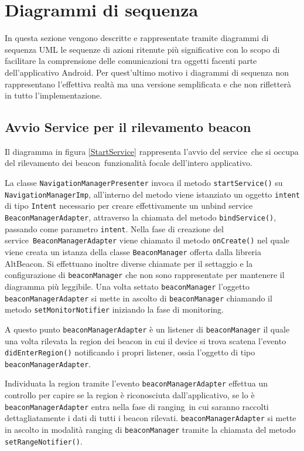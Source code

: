 \documentclass[../DefinizioneDiProdotto.tex]{subfiles}
\begin{document}
\section{Diagrammi di sequenza}

	In questa sezione vengono descritte e rappresentate tramite diagrammi di sequenza UML le sequenze di azioni ritenute più significative con lo scopo di facilitare la comprensione delle comunicazioni tra oggetti facenti parte dell'applicativo Android\g. Per quest'ultimo motivo i diagrammi di sequenza non rappresentano l'effettiva realtà ma una versione semplificata e che non rifletterà in tutto l'implementazione.
	
	\subsection{Avvio Service per il rilevamento beacon}
	
	
		Il diagramma in figura \ref{StartService} rappresenta l'avvio del service\g\ che si occupa del rilevamento dei beacon\g\, funzionalità focale dell'intero applicativo.
		
	La classe \verb|NavigationManagerPresenter| invoca il metodo \verb|startService()| su \verb|NavigationManagerImp|, all'interno del metodo viene istanziato un oggetto \verb|intent| di tipo \verb|Intent| necessario per creare effettivamente un unbind service\g\, \verb|BeaconManagerAdapter|, attraverso la chiamata del metodo \verb|bindService()|,  passando come parametro \verb|intent|. 
	Nella fase di creazione del service\g\ \verb|BeaconManagerAdapter| viene chiamato il metodo \verb|onCreate()| nel quale viene creata un istanza della classe \verb|BeaconManager| offerta dalla libreria AltBeacon\g. Si effettuano inoltre diverse chiamate per il settaggio e la configurazione di \verb|beaconManager| che non sono rappresentate per mantenere il diagramma più leggibile. Una volta settato \verb|beaconManager| l'oggetto \verb|beaconManagerAdapter| si mette in ascolto di \verb|beaconManager| chiamando il metodo \verb|setMonitorNotifier| iniziando la fase di monitoring\g.
	
	A questo punto \verb|beaconManagerAdapter| è un listener di \verb|beaconManager| il quale una volta rilevata la region dei beacon in cui il device si trova scatena l'evento \verb|didEnterRegion()| notificando i propri listener, ossia l'oggetto di tipo \verb|beaconManagerAdapter|.
	
	Individuata la region tramite l'evento \verb|beaconManagerAdapter| effettua un controllo per capire se la region è riconosciuta dall'applicativo, se lo è \verb|beaconManagerAdapter| entra nella fase di ranging\g\ in cui saranno raccolti dettagliatamente i dati di tutti i beacon rilevati. \verb|beaconManagerAdapter| si mette in ascolto in modalità ranging di \verb|beaconManager| tramite la chiamata del metodo \verb|setRangeNotifier()|.
	
\end{document}
